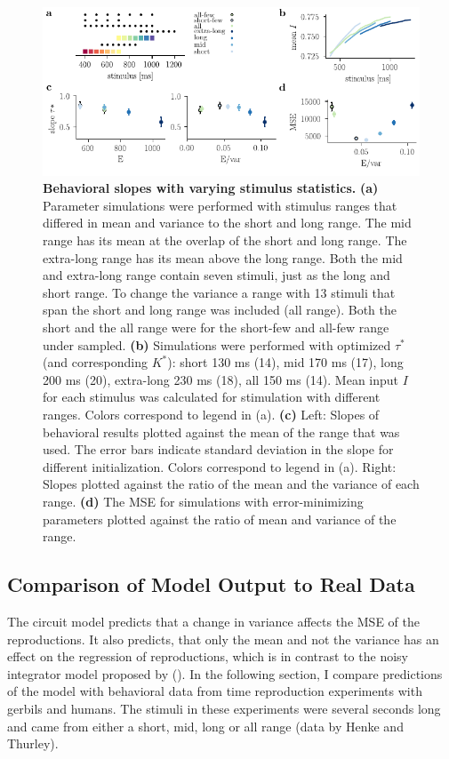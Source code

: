 \documentclass[10pt]{article}
\begin{document}
\begin{figure}[ht]
	\centering
	\includegraphics{figures/ranges_new2.pdf}
	\caption{\textbf{Behavioral slopes with varying stimulus statistics.} 
	\textbf{(a)} Parameter simulations were performed with stimulus ranges that differed in mean and variance to the short and long range. The mid range has its mean at the overlap of the short and long range. The extra-long range has its mean above the long range. Both the mid and extra-long range contain seven stimuli, just as the long and short range. To change the variance a range with 13 stimuli that span the short and long range was included (all range). Both the short and the all range were for the short-few and all-few range under sampled.
	\textbf{(b)} Simulations were performed with optimized $\tau^*$ (and corresponding  $K^*$): short 130 ms (14), mid 170 ms (17), long 200 ms (20), extra-long 230 ms (18), all 150 ms (14). Mean input $I$ for each stimulus was calculated for stimulation with different ranges. Colors correspond to legend in (a). 
	\textbf{(c)} Left: Slopes of behavioral results plotted against the mean of the range that was used. The error bars indicate standard deviation in the slope for different initialization. Colors correspond to legend in (a).
	Right: Slopes plotted against the ratio of the mean and the variance of each range. 
	\textbf{(d)} The MSE for simulations with error-minimizing parameters plotted against the ratio of mean and variance of the range.
	}
\label{fig:new_ranges}
\end{figure}

\subsection{Comparison of Model Output to Real Data}
The circuit model predicts that a change in variance affects the MSE of the reproductions.
It also predicts, that only the mean and not the variance has an effect on the regression of reproductions, which is in contrast to the noisy integrator model proposed by \citeauthor{Thurley2016} (\citeyear{Thurley2016}).
In the following section, I compare predictions of the model with behavioral data from time reproduction experiments with gerbils and humans. The stimuli in these experiments were several seconds long and came from either a short, mid, long or all range (data by Henke and Thurley).
\end{document}
